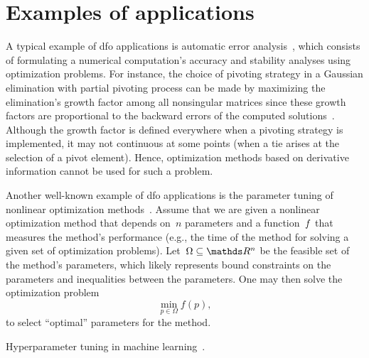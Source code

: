 \section{Examples of  applications}

A typical example of \gls{dfo} applications is automatic error analysis~\cite{Higham_1993,Higham_2002}, which consists of formulating a numerical computation's accuracy and stability analyses using optimization problems.
For instance, the choice of pivoting strategy in a Gaussian elimination with partial pivoting process can be made by maximizing the elimination's growth factor among all nonsingular matrices since these growth factors are proportional to the backward errors of the computed solutions~\cite{Wilkinson_1961}.
Although the growth factor is defined everywhere when a pivoting strategy is implemented, it may not continuous at some points (when a tie arises at the selection of a pivot element).
Hence, optimization methods based on derivative information cannot be used for such a problem.

Another well-known example of \gls{dfo} applications is the parameter tuning of nonlinear optimization methods~\cite{Audet_Orban_2006}.
Assume that we are given a nonlinear optimization method that depends on~$n$ parameters and a function~$f$ that measures the method's performance (e.g., the  time of the method for solving a given set of optimization problems).
Let~$\Omega \subseteq \R^n$ be the feasible set of the method's parameters, which likely represents bound constraints on the parameters and inequalities between the parameters.
One may then solve the optimization problem
\begin{equation*}
    \min_{p \in \Omega} f(p),
\end{equation*}
to select \enquote{optimal} parameters for the method.

Hyperparameter tuning in machine learning~\cite{Ghanbari_Scheinberg_2017}.%


